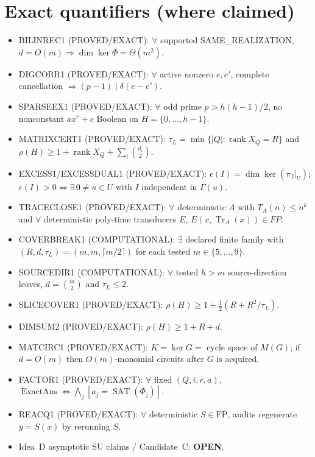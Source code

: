 \documentclass[11pt]{article}
\begin{document}
\section*{Exact quantifiers (where claimed)}
\begin{itemize}
\item BILINREC1 (PROVED/EXACT): $\forall$ supported SAME\_REALIZATION,
$d=O(m)\Rightarrow\dim\ker\Phi=\Theta(m^2)$.
\item DIGCORR1 (PROVED/EXACT): $\forall$ active nonzero $e,e'$, complete cancellation
$\Rightarrow(p-1)\mid\delta(e-e')$.
\item SPARSEEX1 (PROVED/EXACT): $\forall$ odd prime $p>h(h-1)/2$, no nonconstant
$ax^e+c$ Boolean on $H=\{0,\ldots,h-1\}$.
\item MATRIXCERT1 (PROVED/EXACT): $\tau_L=\min\{|Q|:\operatorname{rank}X_Q=R\}$ and
$\rho(H)\ge1+\operatorname{rank}X_Q+\sum_i\binom{d_i}{2}$.
\item EXCESS1/EXCESSDUAL1 (PROVED/EXACT): $\epsilon(I)=\dim\ker(\pi_I|_U)$;
$\epsilon(I)>0\iff\exists\,0\neq u\in U$ with $I$ independent in $\Gamma(u)$.
\item TRACECLOSE1 (PROVED/EXACT): $\forall$ deterministic $A$ with $T_A(n)\le n^k$ and
$\forall$ deterministic poly-time transducers $E$, $E(x,\operatorname{Tr}_A(x))\in FP$.
\item COVERBREAK1 (COMPUTATIONAL): $\exists$ declared finite family with
$(R,d,\tau_L)=(m,m,\lceil m/2\rceil)$ for each tested $m\in\{5,\ldots,9\}$.
\item SOURCEDIR1 (COMPUTATIONAL): $\forall$ tested $h>m$ source-direction leaves,
$d=\binom{m}{2}$ and $\tau_L\le 2$.
\item SLICECOVER1 (PROVED/EXACT): $\rho(H)\ge 1+\tfrac12(R+R^2/\tau_L)$.
\item DIMSUM2 (PROVED/EXACT): $\rho(H)\ge 1+R+d$.
\item MATCIRC1 (PROVED/EXACT): $K=\ker G=$ cycle space of $M(G)$; if $d=O(m)$ then
$O(m)$-monomial circuits after $G$ is acquired.
\item FACTOR1 (PROVED/EXACT): $\forall$ fixed $(Q,i,r,a)$,
$\operatorname{ExactAns}\iff\bigwedge_j[a_j=\operatorname{SAT}(\Phi_j)]$.
\item REACQ1 (PROVED/EXACT): $\forall$ deterministic $S\in\mathrm{FP}$, audits regenerate $y=S(x)$
by rerunning $S$.
\item Idea~D asymptotic SU claims / Candidate~C: \textbf{OPEN}.
\end{itemize}
\end{document}
